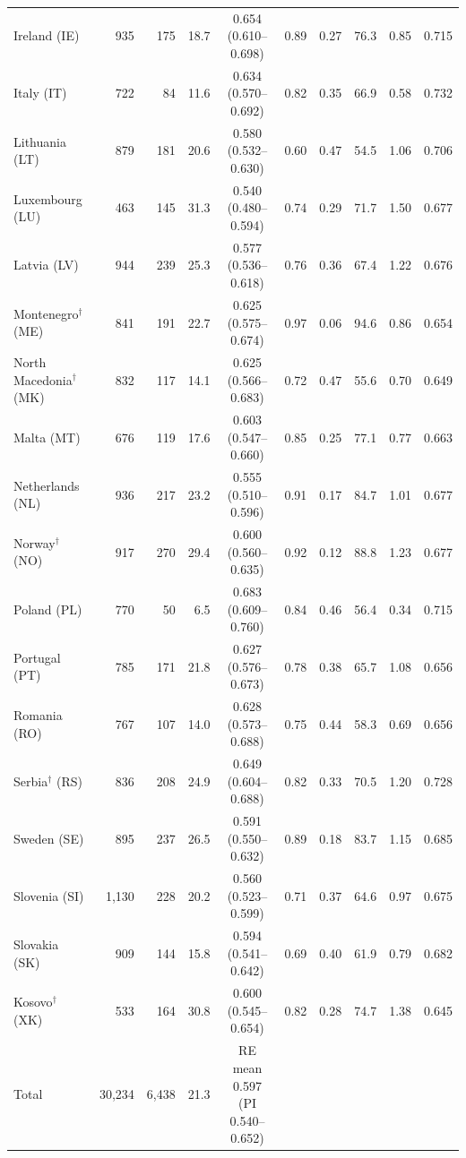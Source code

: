 \begin{center}
\begin{longtable}{@{}lrrrcccccc@{}}
Ireland (IE) & 935 & 175 & 18.7 & 0.654 (0.610--0.698) & 0.89 & 0.27 & 76.3 & 0.85 & 0.715\\
Italy (IT) & 722 & 84 & 11.6 & 0.634 (0.570--0.692) & 0.82 & 0.35 & 66.9 & 0.58 & 0.732\\
Lithuania (LT) & 879 & 181 & 20.6 & 0.580 (0.532--0.630) & 0.60 & 0.47 & 54.5 & 1.06 & 0.706\\
Luxembourg (LU) & 463 & 145 & 31.3 & 0.540 (0.480--0.594) & 0.74 & 0.29 & 71.7 & 1.50 & 0.677\\
Latvia (LV) & 944 & 239 & 25.3 & 0.577 (0.536--0.618) & 0.76 & 0.36 & 67.4 & 1.22 & 0.676\\
Montenegro$^\dagger$ (ME) & 841 & 191 & 22.7 & 0.625 (0.575--0.674) & 0.97 & 0.06 & 94.6 & 0.86 & 0.654\\
North Macedonia$^\dagger$ (MK) & 832 & 117 & 14.1 & 0.625 (0.566--0.683) & 0.72 & 0.47 & 55.6 & 0.70 & 0.649\\
Malta (MT) & 676 & 119 & 17.6 & 0.603 (0.547--0.660) & 0.85 & 0.25 & 77.1 & 0.77 & 0.663\\
Netherlands (NL) & 936 & 217 & 23.2 & 0.555 (0.510--0.596) & 0.91 & 0.17 & 84.7 & 1.01 & 0.677\\
Norway$^\dagger$ (NO) & 917 & 270 & 29.4 & 0.600 (0.560--0.635) & 0.92 & 0.12 & 88.8 & 1.23 & 0.677\\
Poland (PL) & 770 & 50 & 6.5 & 0.683 (0.609--0.760) & 0.84 & 0.46 & 56.4 & 0.34 & 0.715\\
Portugal (PT) & 785 & 171 & 21.8 & 0.627 (0.576--0.673) & 0.78 & 0.38 & 65.7 & 1.08 & 0.656\\
Romania (RO) & 767 & 107 & 14.0 & 0.628 (0.573--0.688) & 0.75 & 0.44 & 58.3 & 0.69 & 0.656\\
Serbia$^\dagger$ (RS) & 836 & 208 & 24.9 & 0.649 (0.604--0.688) & 0.82 & 0.33 & 70.5 & 1.20 & 0.728\\
Sweden (SE) & 895 & 237 & 26.5 & 0.591 (0.550--0.632) & 0.89 & 0.18 & 83.7 & 1.15 & 0.685\\
Slovenia (SI) & 1{,}130 & 228 & 20.2 & 0.560 (0.523--0.599) & 0.71 & 0.37 & 64.6 & 0.97 & 0.675\\
Slovakia (SK) & 909 & 144 & 15.8 & 0.594 (0.541--0.642) & 0.69 & 0.40 & 61.9 & 0.79 & 0.682\\
Kosovo$^\dagger$ (XK) & 533 & 164 & 30.8 & 0.600 (0.545--0.654) & 0.82 & 0.28 & 74.7 & 1.38 & 0.645\\
\midrule
Total & 30{,}234 & 6{,}438 & 21.3 & RE mean 0.597 (PI 0.540--0.652) & & & & & \\
\bottomrule\end{longtable}\end{center}
